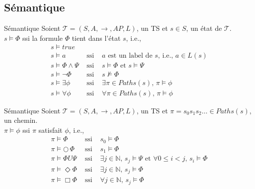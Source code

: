 \documentclass[compress]{beamer}
\begin{document}
\subsection{Sémantique}
\begin{frame}{Sémantique}
  Soient $\mathcal{T} = (S, A, \rightarrow, AP, L)$, un TS et $s \in S$, un {\color{fibeamer@orange}état}
  de $\mathcal{T}$. \\
  $s \models \Phi$ ssi la formule $\Phi$ tient dans l'état $s$, i.e.,
  \begin{align*}
    &s \models true &&&\\
    &s \models a &\text{ ssi }& a \text{ est un label de $s$, i.e., } a \in L(s)&\\
    &s \models \Phi \wedge \Psi&\text{ ssi }& s \models \Phi \text{ et } s \models \Psi&\\
    &s \models \neg \Phi &\text{ ssi }& s \not\models \Phi&\\
    &s \models \exists \phi &\text{ ssi }& \exists \pi \in Paths(s), \, \pi \models \phi&\\
    &s \models \forall \phi &\text{ ssi }& \forall \pi \in Paths(s), \, \pi \models \phi&
  \end{align*}
\end{frame}

\begin{frame}{Sémantique}
  Soient $\mathcal{T} = (S, A, \rightarrow, AP, L)$, un TS et $\pi = s_0s_1s_2\dots \in Paths(s)$, un {\color{fibeamer@orange}chemin}.\\
  $\pi \models \phi$ ssi $\pi$ satisfait $\phi$, i.e.,
  \begin{align*}
  &\pi \models \Phi&\text{ ssi }&s_0 \models \Phi&\\
  &\pi \models \bigcirc\, \Phi&\text{ ssi }&s_1 \models \Phi&\\
  &\pi \models \Phi U \Psi &\text{ ssi }& \exists j \in \mathbb{N},\, s_j \models \Psi
    \text{ et } \forall 0 \leq i < j, \, s_i \models \Phi&\\
  & \pi \models \Diamond \Phi&\text{ ssi }& \exists j \in \mathbb{N}, \, s_j \models \Phi&\\
  & \pi \models \Box \Phi&\text{ ssi }& \forall j \in \mathbb{N}, \, s_j \models \Phi&
  \end{align*}
\end{frame}

\end{document}
